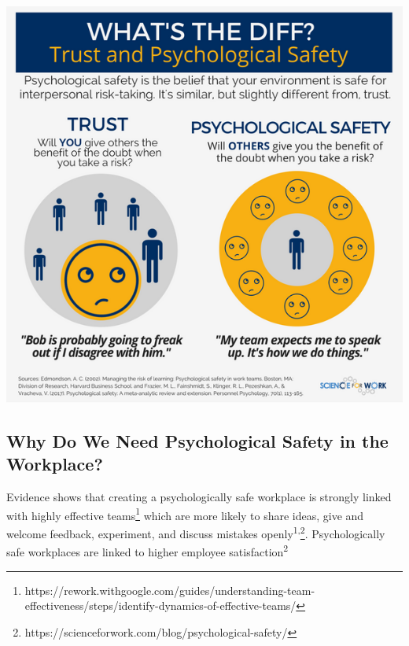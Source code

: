 \documentclass[
  letterpaper,
  DIV=11,
  numbers=noendperiod]{scrreprt}
\begin{document}
\includegraphics{_img/Trust_PsychSafety_Science4Work_icon.png}

\subsection{Why Do We Need Psychological Safety in the
Workplace?}\label{why-do-we-need-psychological-safety-in-the-workplace}

Evidence shows that creating a psychologically safe workplace is
strongly linked with highly effective teams\footnote{https://rework.withgoogle.com/guides/understanding-team-effectiveness/steps/identify-dynamics-of-effective-teams/}
which are more likely to share ideas, give and welcome feedback,
experiment, and discuss mistakes openly\textsuperscript{1,}\footnote{https://scienceforwork.com/blog/psychological-safety/}.
Psychologically safe workplaces are linked to higher employee
satisfaction\textsuperscript{2}
\end{document}
